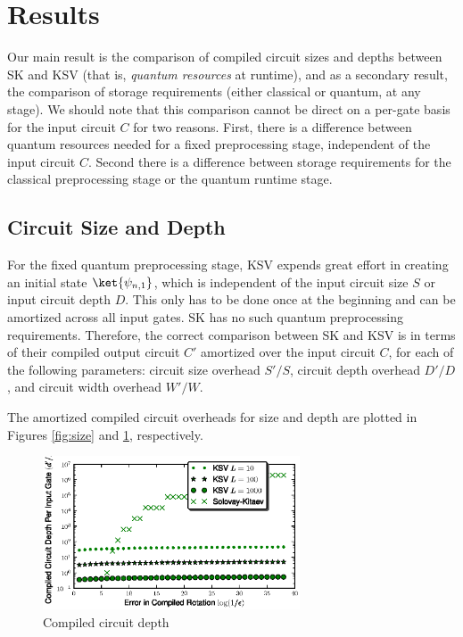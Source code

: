 \section{Results}
\label{sec:results}

Our main result is the comparison of compiled circuit sizes and depths between 
SK and KSV (that is, \emph{quantum resources} at runtime),
and as a secondary result, the comparison of storage requirements (either
classical or quantum, at any stage).
We should note that this comparison cannot be
direct on a per-gate basis for the input circuit $C$ for two reasons.
First, there is a difference between quantum resources needed for a fixed
preprocessing stage, independent of the input circuit $C$. Second there is a
difference between storage requirements for the classical preprocessing stage
or the quantum runtime stage.

\subsection{Circuit Size and Depth}
\label{subsec:results-size-depth}

For the fixed quantum preprocessing stage,
KSV expends great effort in creating an initial state
$\ket{\psi_{n,1}}$, which is independent of the input circuit size $S$ or
input circuit depth $D$.
This only has to be done once at the beginning and can
be amortized across all input gates. SK has no such quantum preprocessing
requirements.
Therefore, the correct comparison between
SK and KSV is in terms of their compiled output circuit $C'$ amortized over
the input circuit $C$, for each of the following parameters:
circuit size overhead $S'/S$,
circuit depth overhead $D'/D$,
and circuit width overhead $W'/W$.

The amortized compiled circuit overheads for size and depth are plotted in
Figures \ref{fig:size} and
\ref{fig:depth}, respectively.

\begin{center}
\begin{figure}[h!]
\label{fig:depth}
\includegraphics[width=3in]{figures/ksv-depth.eps}
\caption{Compiled circuit depth}
\label{fig:depth}
\end{figure}
\end{center}

